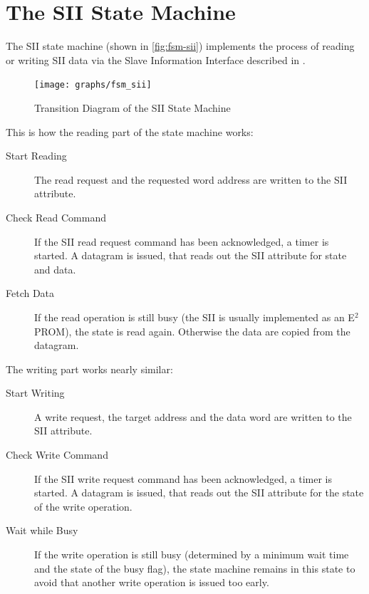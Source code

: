\documentclass[a4paper,12pt,BCOR6mm,bibtotoc,idxtotoc]{scrbook}
\begin{document}
\section{The SII State Machine}
\label{sec:fsm-sii}

The SII state machine (shown in \autoref{fig:fsm-sii})
implements the process of reading or writing SII data via the Slave
Information Interface described in \cite[sec.~6.4]{dlspec}.

\begin{figure}[htbp]
  \centering
  \texttt{[image: graphs/fsm\_sii]}
  \caption{Transition Diagram of the SII State Machine}
  \label{fig:fsm-sii}
\end{figure}

This is how the reading part of the state machine works:

\begin{description}

\item[Start Reading] The read request and the requested word address are
written to the SII attribute.

\item[Check Read Command] If the SII read request command has been
acknowledged, a timer is started. A datagram is issued, that reads out the SII
attribute for state and data.

\item[Fetch Data] If the read operation is still busy (the SII is usually
implemented as an E$^2$PROM), the state is read again. Otherwise the data are
copied from the datagram.

\end{description}

The writing part works nearly similar:

\begin{description}

\item[Start Writing] A write request, the target address and the data word are
written to the SII attribute.

\item[Check Write Command] If the SII write request command has been
acknowledged, a timer is started. A datagram is issued, that reads out the SII
attribute for the state of the write operation.

\item[Wait while Busy] If the write operation is still busy (determined by a
minimum wait time and the state of the busy flag), the state machine remains in
this state to avoid that another write operation is issued too early.

\end{description}
\end{document}
